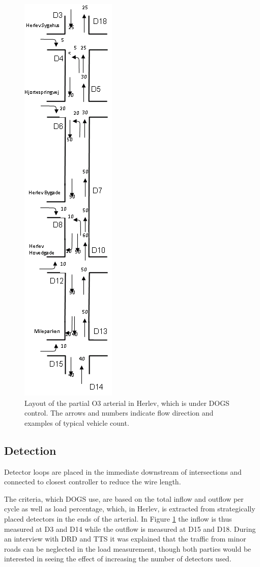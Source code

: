 \begin{figure}[!ht]
\centering
\includegraphics[scale=0.5]{dogs_herlev.png} 
\caption{Layout of the partial O3 arterial in Herlev, which is under DOGS control. The arrows and numbers indicate flow direction and examples of typical vehicle count.}
\label{fig:dogs_herlev}
\end{figure}

\subsection{Detection}
Detector loops are placed in the immediate downstream of intersections and connected to closest controller to reduce the wire length. 

The criteria, which DOGS use, are based on the total inflow and outflow per cycle as well as load percentage, which, in Herlev, is extracted from strategically placed detectors in the ends of the arterial. In Figure \ref{fig:dogs_herlev} the inflow is thus measured at D3 and D14 while the outflow is measured at D15 and D18. 
During an interview with DRD and TTS it was explained that the traffic from minor roads can be neglected in the load measurement, though both parties would be interested in seeing the effect of increasing the number of detectors used.

